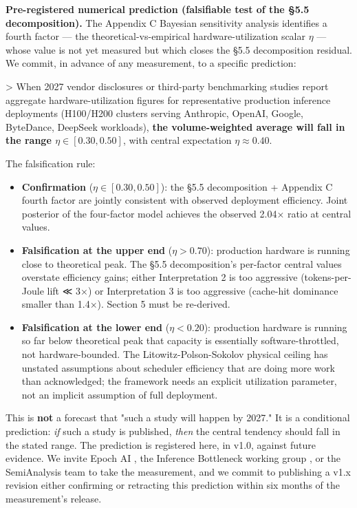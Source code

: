 \documentclass[11pt,a4paper]{article}
\begin{document}
\textbf{Pre-registered numerical prediction (falsifiable test of the §5.5 decomposition).} The Appendix C Bayesian sensitivity analysis identifies a fourth factor --- the theoretical-vs-empirical hardware-utilization scalar $\eta$ --- whose value is not yet measured but which closes the §5.5 decomposition residual. We commit, in advance of any measurement, to a specific prediction:

> When 2027 vendor disclosures or third-party benchmarking studies report aggregate hardware-utilization figures for representative production inference deployments (H100/H200 clusters serving Anthropic, OpenAI, Google, ByteDance, DeepSeek workloads), \textbf{the volume-weighted average will fall in the range $\eta \in [0.30, 0.50]$}, with central expectation $\eta \approx 0.40$.

The falsification rule:

\begin{itemize}
  \item \textbf{Confirmation} ($\eta \in [0.30, 0.50]$): the §5.5 decomposition + Appendix C fourth factor are jointly consistent with observed deployment efficiency. Joint posterior of the four-factor model achieves the observed 2.04× ratio at central values.
  \item \textbf{Falsification at the upper end} ($\eta > 0.70$): production hardware is running close to theoretical peak. The §5.5 decomposition's per-factor central values overstate efficiency gains; either Interpretation 2 is too aggressive (tokens-per-Joule lift ≪ 3×) or Interpretation 3 is too aggressive (cache-hit dominance smaller than 1.4×). Section 5 must be re-derived.
  \item \textbf{Falsification at the lower end} ($\eta < 0.20$): production hardware is running so far below theoretical peak that capacity is essentially software-throttled, not hardware-bounded. The Litowitz-Polson-Sokolov physical ceiling has unstated assumptions about scheduler efficiency that are doing more work than acknowledged; the framework needs an explicit utilization parameter, not an implicit assumption of full deployment.
\end{itemize}

This is \textbf{not} a forecast that "such a study will happen by 2027." It is a conditional prediction: \emph{if} such a study is published, \emph{then} the central tendency should fall in the stated range. The prediction is registered here, in v1.0, against future evidence. We invite Epoch AI \cite{epoch2026inference}, the Inference Bottleneck working group \cite{inference2026bottleneck}, or the SemiAnalysis team \cite{patel2026semianalysis} to take the measurement, and we commit to publishing a v1.x revision either confirming or retracting this prediction within six months of the measurement's release.
\end{document}
